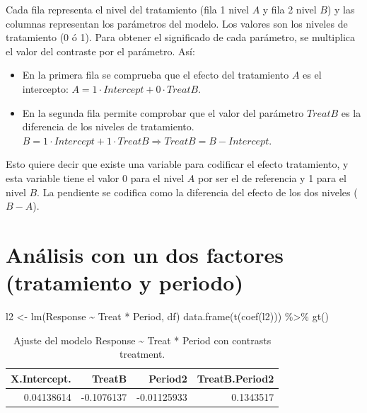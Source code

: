\documentclass[
  12pt,
  a4paper,
  extrafontsizes,
  onecolumn,
  openright,
  table]{memoir}
\newenvironment{Shaded}{\begin{snugshade}}{\end{snugshade}}
\newcommand{\FunctionTok}[1]{\textcolor[rgb]{0.28,0.35,0.67}{#1}}
\newcommand{\NormalTok}[1]{\textcolor[rgb]{0.00,0.23,0.31}{#1}}
\newcommand{\OtherTok}[1]{\textcolor[rgb]{0.00,0.23,0.31}{#1}}
\newcommand{\SpecialCharTok}[1]{\textcolor[rgb]{0.37,0.37,0.37}{#1}}
\providecommand{\tightlist}{%
  \setlength{\itemsep}{0pt}\setlength{\parskip}{0pt}}\usepackage{longtable,booktabs,array}
\begin{document}
\normalsize

Cada fila representa el nivel del tratamiento (fila 1 nivel \(A\) y fila
2 nivel \(B\)) y las columnas representan los parámetros del modelo. Los
valores son los niveles de tratamiento (0 ó 1). Para obtener el
significado de cada parámetro, se multiplica el valor del contraste por
el parámetro. Así:

\begin{itemize}
\tightlist
\item
  En la primera fila se comprueba que el efecto del tratamiento \(A\) es
  el intercepto: \(A = 1 \cdot Intercept + 0 \cdot TreatB\).
\item
  En la segunda fila permite comprobar que el valor del parámetro
  \(TreatB\) es la diferencia de los niveles de tratamiento.
  \(B = 1 \cdot Intercept + 1 \cdot TreatB \Rightarrow TreatB = B - Intercept\).
\end{itemize}

Esto quiere decir que existe una variable para codificar el efecto
tratamiento, y esta variable tiene el valor 0 para el nivel \(A\) por
ser el de referencia y 1 para el nivel \(B\). La pendiente se codifica
como la diferencia del efecto de los dos niveles (\(B - A\)).

\hypertarget{anuxe1lisis-con-un-dos-factores-tratamiento-y-periodo}{%
\section{Análisis con un dos factores (tratamiento y
periodo)}\label{anuxe1lisis-con-un-dos-factores-tratamiento-y-periodo}}

\scriptsize

\begin{Shaded}
\begin{Highlighting}[]
\NormalTok{l2 }\OtherTok{\textless{}{-}} \FunctionTok{lm}\NormalTok{(Response }\SpecialCharTok{\textasciitilde{}}\NormalTok{ Treat }\SpecialCharTok{*}\NormalTok{ Period, df)}
\FunctionTok{data.frame}\NormalTok{(}\FunctionTok{t}\NormalTok{(}\FunctionTok{coef}\NormalTok{(l2))) }\SpecialCharTok{\%\textgreater{}\%} \FunctionTok{gt}\NormalTok{()}
\end{Highlighting}
\end{Shaded}

\hypertarget{tbl-l2}{}
\begin{longtable}{rrrr}
\caption{\label{tbl-l2}Ajuste del modelo Response \textasciitilde{} Treat * Period con
contrasts treatment. }\tabularnewline

\toprule
X.Intercept. & TreatB & Period2 & TreatB.Period2 \\ 
\midrule
0.04138614 & -0.1076137 & -0.01125933 & 0.1343517 \\ 
\bottomrule
\end{longtable}
\end{document}
